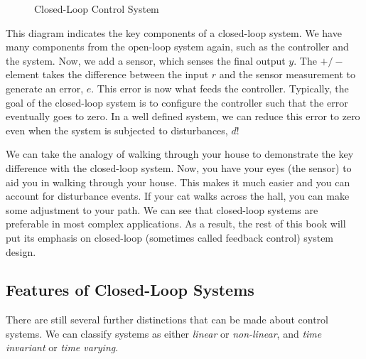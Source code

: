 \begin{figure}[ht]


    \caption{Closed-Loop Control System}
    \label{fig:Closed Loop Controller}
\end{figure}

This diagram indicates the key components of a closed-loop system. We have many components from the open-loop system again, such as the controller and the system. Now, we add a sensor, which senses the final output $y$. The $+/-$ element takes the difference between the input $r$ and the sensor measurement to generate an error, $e$. This error is now what feeds the controller. Typically, the goal of the closed-loop system is to configure the controller such that the error eventually goes to zero. In a well defined system, we can reduce this error to zero even when the system is subjected to disturbances, $d$!

We can take the analogy of walking through your house to demonstrate the key difference with the closed-loop system. Now, you have your eyes (the sensor) to aid you in walking through your house. This makes it much easier and you can account for disturbance events. If your cat walks across the hall, you can make some adjustment to your path. We can see that closed-loop systems are preferable in most complex applications. As a result, the rest of this book will put its emphasis on closed-loop (sometimes called feedback control) system design.

\subsection{Features of Closed-Loop Systems}
There are still several further distinctions that can be made about control systems. We can classify systems as either \textit{linear} or \textit{non-linear}, and \textit{time invariant} or \textit{time varying}.

